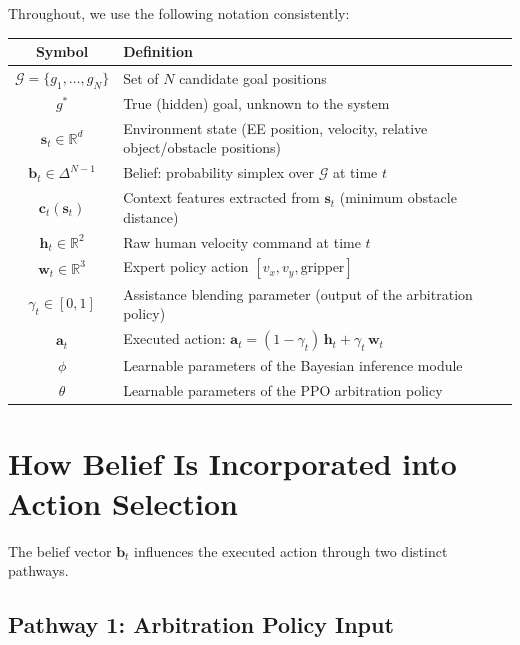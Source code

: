 \documentclass[11pt]{article}
\newcommand{\bvec}{\mathbf{b}_t}
\newcommand{\svec}{\mathbf{s}_t}
\newcommand{\cvec}{\mathbf{c}_t}
\newcommand{\hvec}{\mathbf{h}_t}
\newcommand{\wvec}{\mathbf{w}_t}
\newcommand{\avec}{\mathbf{a}_t}
\newcommand{\goalset}{\mathcal{G}}
\newcommand{\real}{\mathbb{R}}
\begin{document}
\noindent Throughout, we use the following notation consistently:
\begin{center}
\begin{tabular}{@{}cl@{}}
\toprule
Symbol & Definition \\
\midrule
$\goalset = \{g_1, \ldots, g_N\}$ & Set of $N$ candidate goal positions \\
$g^*$ & True (hidden) goal, unknown to the system \\
$\svec \in \real^d$ & Environment state (EE position, velocity, relative object/obstacle positions) \\
$\bvec \in \Delta^{N-1}$ & Belief: probability simplex over $\goalset$ at time $t$ \\
$\cvec(\svec)$ & Context features extracted from $\svec$ (minimum obstacle distance) \\
$\hvec \in \real^2$ & Raw human velocity command at time $t$ \\
$\wvec \in \real^3$ & Expert policy action $[v_x, v_y, \text{gripper}]$ \\
$\gamma_t \in [0,1]$ & Assistance blending parameter (output of the arbitration policy) \\
$\avec$ & Executed action: $\avec = (1 - \gamma_t)\,\hvec + \gamma_t\,\wvec$ \\
$\phi$ & Learnable parameters of the Bayesian inference module \\
$\theta$ & Learnable parameters of the PPO arbitration policy \\
\bottomrule
\end{tabular}
\end{center}


\section{How Belief Is Incorporated into Action Selection}
\label{sec:belief-to-action}

The belief vector $\bvec$ influences the executed action through two distinct pathways.

\subsection{Pathway 1: Arbitration Policy Input}
\end{document}
